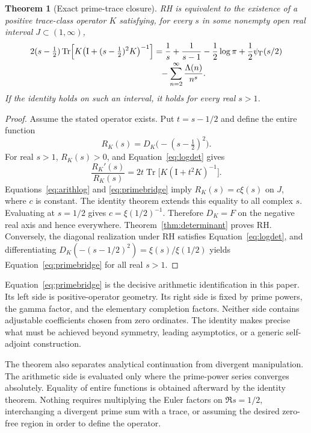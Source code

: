 \documentclass[11pt,letterpaper]{article}
\numberwithin{equation}{section}
\newtheorem{theorem}{Theorem}[section]
\theoremstyle{definition}
\theoremstyle{remark}
\newcommand{\Id}{\mathrm I}
\DeclareMathOperator{\Tr}{Tr}
\begin{document}
\begin{theorem}[Exact prime-trace closure]
\label{thm:primetrace}
RH is equivalent to the existence of a positive trace-class operator $K$ satisfying, for every $s$ in some nonempty open real interval $J\subset(1,\infty)$,
\begin{align}
 2(s-\tfrac12)\Tr\!\left[K\bigl(\Id+(s-\tfrac12)^2K\bigr)^{-1}\right]
 &=\frac1s+\frac1{s-1}-\frac12\log\pi
   +\frac12\psi_\Gamma(s/2)\notag\\[-0.2em]
 &\hspace{0.7em}-\sum_{n=2}^{\infty}\frac{\Lambda(n)}{n^s}.
 \label{eq:primebridge}
\end{align}
If the identity holds on such an interval, it holds for every real $s>1$.
\end{theorem}
\begin{proof}
Assume the stated operator exists. Put $t=s-1/2$ and define the entire function
\[
 R_K(s)=D_K\bigl(-(s-\tfrac12)^2\bigr).
\]
For real $s>1$, $R_K(s)>0$, and Equation~\eqref{eq:logdet} gives
\[
 \frac{R_K'(s)}{R_K(s)}
 =2t\Tr\bigl[K(\Id+t^2K)^{-1}\bigr].
\]
Equations~\eqref{eq:arithlog} and \eqref{eq:primebridge} imply $R_K(s)=c\xi(s)$ on $J$, where $c$ is constant. The identity theorem extends this equality to all complex $s$. Evaluating at $s=1/2$ gives $c=\xi(1/2)^{-1}$. Therefore $D_K=F$ on the negative real axis and hence everywhere. Theorem~\ref{thm:determinant} proves RH. Conversely, the diagonal realization under RH satisfies Equation~\eqref{eq:logdet}, and differentiating $D_K(-(s-1/2)^2)=\xi(s)/\xi(1/2)$ yields Equation~\eqref{eq:primebridge} for all real $s>1$.
\end{proof}

Equation~\eqref{eq:primebridge} is the decisive arithmetic identification in this paper. Its left side is positive-operator geometry. Its right side is fixed by prime powers, the gamma factor, and the elementary completion factors. Neither side contains adjustable coefficients chosen from zero ordinates. The identity makes precise what must be achieved beyond symmetry, leading asymptotics, or a generic self-adjoint construction.

The theorem also separates analytical continuation from divergent manipulation. The arithmetic side is evaluated only where the prime-power series converges absolutely. Equality of entire functions is obtained afterward by the identity theorem. Nothing requires multiplying the Euler factors on $\Re s=1/2$, interchanging a divergent prime sum with a trace, or assuming the desired zero-free region in order to define the operator.
\end{document}
